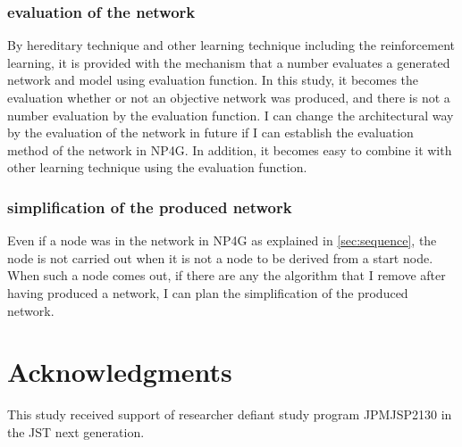 \documentclass{article}
\begin{document}
\subsubsection {evaluation of the network}
By hereditary technique and other learning technique including the reinforcement learning, it is provided with the mechanism that a number evaluates a generated network and model using evaluation function.
In this study, it becomes the evaluation whether or not an objective network was produced, and there is not a number evaluation by the evaluation function.
I can change the architectural way by the evaluation of the network in future if I can establish the evaluation method of the network in NP4G.
In addition, it becomes easy to combine it with other learning technique using the evaluation function.
\subsubsection {simplification of the produced network}
Even if a node was in the network in NP4G as explained in \ref{sec:sequence}, the node is not carried out when it is not a node to be derived from a start node.
When such a node comes out, if there are any the algorithm that I remove after having produced a network, I can plan the simplification of the produced network.
\section*{Acknowledgments}
This study received support of researcher defiant study program JPMJSP2130 in the JST next generation.


  
  
\end{document}
